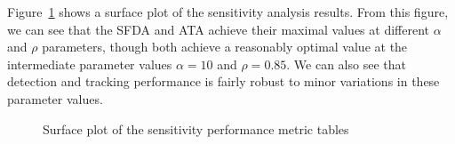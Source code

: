 \documentclass[twocolumn, final]{svjour3}
\begin{document}
Figure~\ref{fig:sens_surf} shows a surface plot of the sensitivity analysis results. From this figure, we can see that the SFDA and ATA achieve their maximal values at different $\alpha$ and $\rho$ parameters, though both achieve a reasonably optimal value at the intermediate parameter values $\alpha = 10$ and $\rho = 0.85$. We can also see that detection and tracking performance is fairly robust to minor variations in these parameter values.





\begin{figure}[!]
  \centering             
  \caption{Surface plot of the sensitivity performance metric tables}
  \label{fig:sens_surf}
\end{figure}




\end{document}
